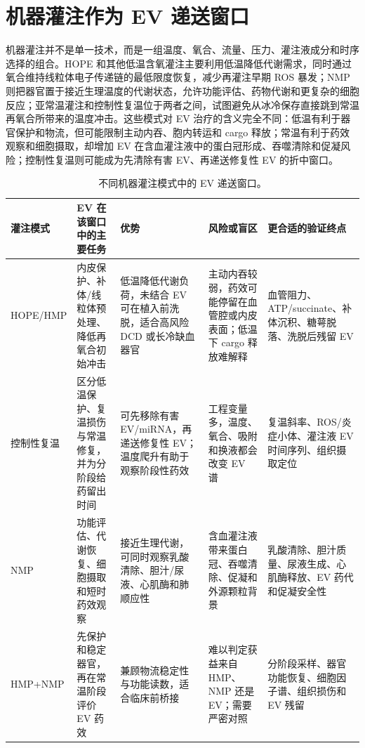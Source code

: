 \documentclass[11pt,a4paper]{article}
\begin{document}
\section{机器灌注作为 EV
递送窗口}\label{ux673aux5668ux704cux6ce8ux4f5cux4e3a-ev-ux9012ux9001ux7a97ux53e3}

机器灌注并不是单一技术，而是一组温度、氧合、流量、压力、灌注液成分和时序选择的组合。HOPE
和其他低温含氧灌注主要利用低温降低代谢需求，同时通过氧合维持线粒体电子传递链的最低限度恢复，减少再灌注早期 ROS
暴发；NMP 则把器官置于接近生理温度的代谢状态，允许功能评估、药物代谢和更复杂的细胞反应；亚常温灌注和控制性复温位于两者之间，试图避免从冰冷保存直接跳到常温再氧合所带来的温度冲击\cite{currentevidenceand2023, recentmethodsof2022, theroleof2023}。这些模式对 EV
治疗的含义完全不同：低温有利于器官保护和物流，但可能限制主动内吞、胞内转运和 cargo
释放；常温有利于药效观察和细胞摄取，却增加 EV 在含血灌注液中的蛋白冠形成、吞噬清除和促凝风险；控制性复温则可能成为先清除有害 EV、再递送修复性 EV
的折中窗口。

\begin{table}[htbp]
\centering
\scriptsize
\caption{不同机器灌注模式中的 EV 递送窗口。}
\begin{tabularx}{\textwidth}{p{}YYYY}
\toprule
灌注模式 & EV 在该窗口中的主要任务 & 优势 & 风险或盲区 & 更合适的验证终点 \\
\midrule
HOPE/HMP & 内皮保护、补体/线粒体预处理、降低再氧合初始冲击 & 低温降低代谢负荷，未结合 EV 可在植入前洗脱，适合高风险 DCD 或长冷缺血器官 & 主动内吞较弱，药效可能停留在血管腔或内皮表面；低温下 cargo 释放难解释 & 血管阻力、ATP/succinate、补体沉积、糖萼脱落、洗脱后残留 EV \\
控制性复温 & 区分低温保护、复温损伤与常温修复，并为分阶段给药留出时间 & 可先移除有害 EV/miRNA，再递送修复性 EV；温度爬升有助于观察阶段性药效 & 工程变量多，温度、氧合、吸附和换液都会改变 EV 谱 & 复温斜率、ROS/炎症小体、灌注液 EV 时间序列、组织摄取定位 \\
NMP & 功能评估、代谢恢复、细胞摄取和短时药效观察 & 接近生理代谢，可同时观察乳酸清除、胆汁/尿液、心肌酶和肺顺应性 & 含血灌注液带来蛋白冠、吞噬清除、促凝和外源颗粒背景 & 乳酸清除、胆汁质量、尿液生成、心肌酶释放、EV 药代和促凝安全性 \\
HMP+NMP & 先保护和稳定器官，再在常温阶段评价 EV 药效 & 兼顾物流稳定性与功能读数，适合临床前桥接 & 难以判定获益来自 HMP、NMP 还是 EV；需要严密对照 & 分阶段采样、器官功能恢复、细胞因子谱、组织损伤和 EV 残留 \\
\bottomrule
\end{tabularx}
\end{table}
\end{document}
